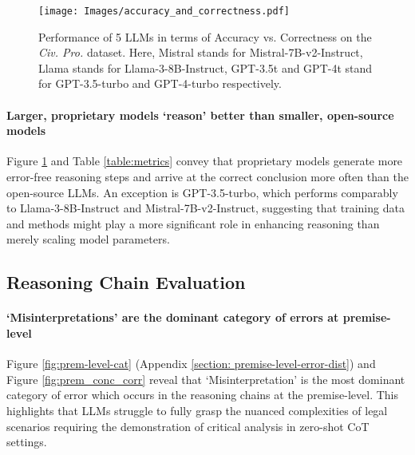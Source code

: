 \begin{figure}[h]
    \centering
    \texttt{[image: Images/accuracy\_and\_correctness.pdf]}
    \caption{Performance of 5 LLMs in terms of Accuracy vs. Correctness on the \textit{Civ. Pro.} dataset. Here, Mistral stands for Mistral-7B-v2-Instruct, Llama stands for Llama-3-8B-Instruct, GPT-3.5t and GPT-4t stand for GPT-3.5-turbo and GPT-4-turbo respectively.}
    \label{fig:acc_correctness_results}
\end{figure}


\paragraph{Larger, proprietary models `reason' better than smaller, open-source models}
Figure \ref{fig:acc_correctness_results} and Table \ref{table:metrics} convey that proprietary models generate more error-free reasoning steps and arrive at the correct conclusion more often than the open-source LLMs. An exception is GPT-3.5-turbo, which performs comparably to Llama-3-8B-Instruct and Mistral-7B-v2-Instruct, suggesting that training data and methods might play a more significant role in enhancing reasoning than merely scaling model parameters. 

\subsection{Reasoning Chain Evaluation}
\paragraph{`Misinterpretations' are the dominant category of errors at premise-level}
Figure \ref{fig:prem-level-cat} (Appendix \ref{section: premise-level-error-dist}) and Figure \ref{fig:prem_conc_corr} reveal that `Misinterpretation' is the most dominant category of error which occurs in the reasoning chains at the premise-level. This highlights that  LLMs struggle to fully grasp the nuanced complexities of legal scenarios requiring the demonstration of critical analysis in zero-shot CoT settings.  

